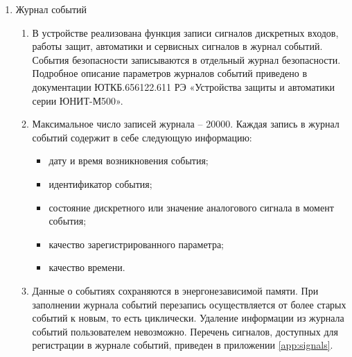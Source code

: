\documentclass[a4paper, 12pt, table, hidelinks, DIV=calc]{extarticle}
\def\ManualUnitGeneral{ЮТКБ.656122.611 РЭ «Устройства защиты и автоматики серии ЮНИТ-М500»}
\begin{document}
\begin{enumerate}[label=\arabic{section}.\arabic{subsection}.\arabic*, labelsep=7pt, leftmargin=0pt, itemindent=60pt, align=left]
\begin{enumerate}
\item
Пуск осциллографа производится по факту изменения состояния дискретных сигналов, заданных в качестве критериев пуска.
В зависимости от длительности записи предаварийного и послеаварийного режима, в памяти может храниться разное количество осциллограмм.
Данные, собранные аварийным осциллографом, сохраняются в энергонезависимой памяти устройства и циклически перезаписываются.
Удаление записей аварийного осциллографа пользователем невозможно.

\item
Перечень сигналов, доступных для регистрации аварийным осциллографом, приведен в приложении \ref{app:signals}.

\end{enumerate}

\item Журнал событий
\begin{enumerate}

\item
В устройстве реализована функция записи сигналов дискретных входов, работы защит, автоматики и сервисных сигналов в журнал событий.
События безопасности записываются в отдельный журнал безопасности.
Подробное описание параметров журналов событий приведено в документации \ManualUnitGeneral.

\item
Максимальное число записей журнала -- 20000.
Каждая запись в журнал событий содержит в себе следующую информацию:
\begin{itemize}
\item дату и время возникновения события;
\item идентификатор события;
\item состояние дискретного или значение аналогового сигнала в момент события;
\item качество зарегистрированного параметра;
\item качество времени.
\end{itemize}

\item
Данные о событиях сохраняются в энергонезависимой памяти.
При заполнении журнала событий перезапись осуществляется от более старых событий к новым, то есть циклически.
Удаление информации из журнала событий пользователем невозможно.
Перечень сигналов, доступных для регистрации в журнале событий, приведен в приложении \ref{app:signals}.

\end{enumerate}


\end{enumerate}
\end{document}
